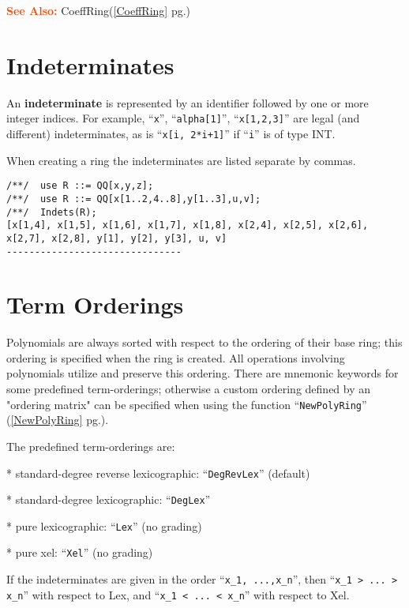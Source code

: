 \documentclass[a4paper]{mybook}
\newcommand\SeeAlso{\par\textcolor{OrangeRed}{\textbf{\large See Also: }}}
\begin{document}
\SeeAlso %
  CoeffRing(\ref{CoeffRing} pg.\pageref{CoeffRing})

\section{Indeterminates}
\label{Indeterminates}

        
An \textbf{indeterminate} is represented by an identifier followed by one or
more integer indices.  For example, ``\verb&x&'', ``\verb&alpha[1]&'', ``\verb&x[1,2,3]&'' are legal (and
different) indeterminates,
as is ``\verb&x[i, 2*i+1]&'' if ``\verb&i&'' is of type INT.
\par 
When creating a ring the indeterminates are listed separate by commas.
\begin{Verbatim}[label=example, rulecolor=\color{PineGreen}, frame=single]
/**/  use R ::= QQ[x,y,z];
/**/  use R ::= QQ[x[1..2,4..8],y[1..3],u,v];
/**/  Indets(R);
[x[1,4], x[1,5], x[1,6], x[1,7], x[1,8], x[2,4], x[2,5], x[2,6],
x[2,7], x[2,8], y[1], y[2], y[3], u, v]
-------------------------------
\end{Verbatim}



\section{Term Orderings}
\label{Term Orderings}

        
Polynomials are always sorted with respect to the ordering of their
base ring; this ordering is specified when the ring is created.  All
operations involving polynomials utilize and preserve this ordering.
There are mnemonic keywords for some predefined term-orderings;
otherwise a custom ordering defined by an "ordering matrix" can be
specified when using the function ``\verb&NewPolyRing&'' (\ref{NewPolyRing} pg.\pageref{NewPolyRing}).
\par 
The predefined term-orderings are:
\par 
 * standard-degree reverse lexicographic: ``\verb&DegRevLex&''  (default)
\par 
 * standard-degree lexicographic: ``\verb&DegLex&''
\par 
 * pure lexicographic: ``\verb&Lex&'' (no grading)
\par 
 * pure xel: ``\verb&Xel&'' (no grading)
\par 
If the indeterminates are given in the order ``\verb&x_1, ...,x_n&'',
then ``\verb&x_1 > ... > x_n&'' with respect to Lex, and
``\verb&x_1 < ... < x_n&'' with respect to Xel.
\end{document}
